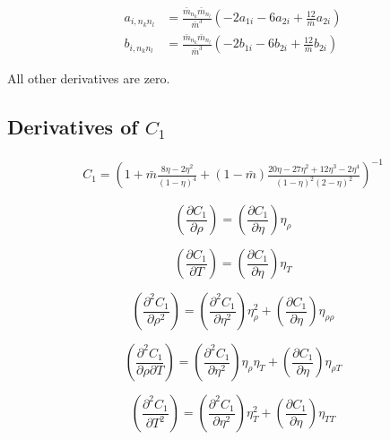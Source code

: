 \documentclass[english]{../thermomemo/thermomemo}
\newcommand*{\pder}[2]{\left(\frac{\partial #1}{\partial #2}\right)}
\newcommand*{\pdder}[2]{\left(\frac{\partial^2 #1}{\partial #2^2}\right)}
\newcommand*{\pdcross}[3]{\left(\frac{\partial^2 #1}{\partial #2 \partial #3}\right)}
\newcommand{\lp}{\left(}
\newcommand{\rp}{\right)}
\begin{document}
\begin{align}
  a_{i,n_k n_l} &= \frac{\bar m_{n_k} \bar m_{n_l}}{\bar m^3} \lp -2 a_{1i} - 6 a_{2i} + \frac{12}{\bar m} a_{2i} \rp \\
  b_{i,n_k n_l} &= \frac{\bar m_{n_k} \bar m_{n_l}}{\bar m^3} \lp -2 b_{1i} - 6 b_{2i} + \frac{12}{\bar m} b_{2i} \rp
\end{align}

All other derivatives are zero.

\subsection{Derivatives of $C_1$}
\begin{align}
  C_1 = \lp 1 + \bar m \frac{8\eta-2\eta^2}{(1-\eta)^4} + (1-\bar m) \frac{20\eta-27\eta^2+12\eta^3-2\eta^4}{(1-\eta)^2(2-\eta)^2} \rp^{-1}
\end{align}

\begin{equation}
  \pder{C_1}{\rho} = \pder{C_1}{\eta} \eta_{\rho}
\end{equation}

\begin{equation}
  \pder{C_1}{T} = \pder{C_1}{\eta}\eta_{T}
\end{equation}


\begin{equation}
  \pdder{C_1}{\rho} = \pdder{C_1}{\eta}\eta_{\rho}^2 + \pder{C_1}{\eta}\eta_{\rho\rho}
\end{equation}

\begin{equation}
  \pdcross{C_1}{\rho}{T} = \pdder{C_1}{\eta} \eta_{\rho} \eta_{T} + \pder{C_1}{\eta}\eta_{\rho T}
\end{equation}


\begin{equation}
  \pdder{C_1}{T} = \pdder{C_1}{\eta}\eta_{T}^2 + \pder{C_1}{\eta}\eta_{TT}
\end{equation}
\end{document}
